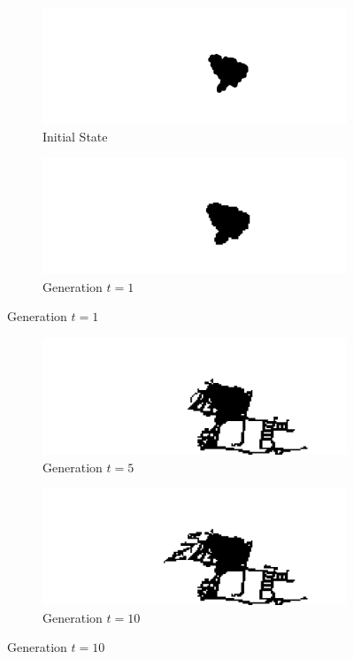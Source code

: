 \begin{figure}[H]
\begin{subfigure}{.5\textwidth}
  \centering
  \includegraphics[width=1\linewidth]{Figures/Chapter4/generation-0-melusi}
  \caption*{Initial State}
\end{subfigure}
\begin{subfigure}{.5\textwidth}
  \centering
  \includegraphics[width=1\linewidth]{Figures/Chapter4/generation-1-melusi}
  \caption*{Generation $t = 1$}
\end{subfigure}
\end{figure}

\begin{figure}[H]
\begin{subfigure}{.5\textwidth}
  \centering
  \includegraphics[width=1\linewidth]{Figures/Chapter4/generation-5-melusi}
  \caption*{Generation $t = 5$}
\end{subfigure}
\begin{subfigure}{.5\textwidth}
  \centering
  \includegraphics[width=1\linewidth]{Figures/Chapter4/generation-10-melusi}
  \caption*{Generation $t = 10$}
\end{subfigure}
\end{figure}


